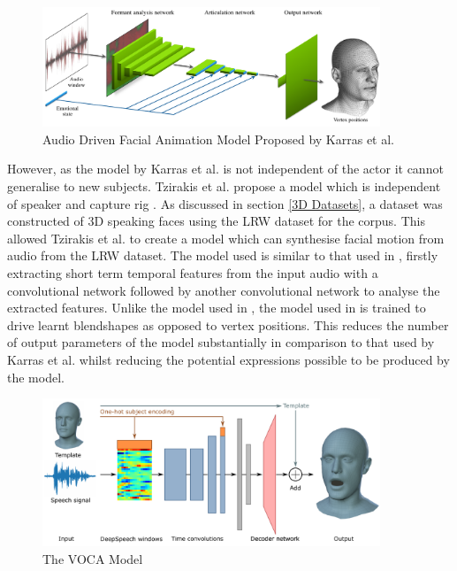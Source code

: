 \begin{figure}[h]
    \centering
        \includegraphics[width=0.9\textwidth]{figures/lit_review/karras_model.png}
    \caption{Audio Driven Facial Animation Model Proposed by Karras et al. \cite{Karras2017a}}\label{fig:Karras_Model}
\end{figure}

However, as the model by Karras et al. is not independent of the actor it cannot generalise to new subjects.
Tzirakis et al. propose a model which is independent of speaker and capture rig \cite{Tzirakis2019}.
As discussed in section \ref{3D Datasets}, a dataset was constructed of 3D speaking faces using the LRW dataset \cite{Chung2016} for the corpus.
This allowed Tzirakis et al. to create a model which can synthesise facial motion from audio from the LRW dataset.
The model used is similar to that used in \cite{Karras2017a}, firstly extracting short term temporal features from the input audio with a convolutional network followed by another convolutional network to analyse the extracted features.
Unlike the model used in \cite{Karras2017a}, the model used in \cite{Tzirakis2019} is trained to drive learnt blendshapes as opposed to vertex positions.
This reduces the number of output parameters of the model substantially in comparison to that used by Karras et al. whilst reducing the potential expressions possible to be produced by the model.

\begin{figure}[h]
    \centering
        \includegraphics[width=0.9\textwidth]{figures/lit_review/voca_model.png}
    \caption{The VOCA Model \cite{Cudeiro2019}}\label{fig:VOCA_model}
\end{figure}

